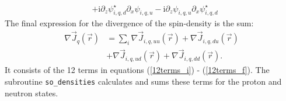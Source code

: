 \documentclass[4p]{elsarticle}
\begin{document}
\begin{itemize}
\begin{align}
& + \mathrm{i} \partial_z  \psi_{i,q,d}^\star \partial_x \psi_{i,q,u} - \mathrm{i} \partial_z \psi_{i,q,u} \partial_x  \psi_{i,q,d}^\star \nonumber
\label{12terms_f}
\end{align}
The final expression for the divergence of the spin-density is the sum:
\begin{align}
\nabla \vec{J}_q (\vec{r}) &=  \sum\nolimits_i  \nabla \vec{J}_{i,q, uu} (\vec{r}) + \nabla \vec{J}_{i,q, d u} (\vec{r}) \nonumber\\
&+ \nabla \vec{J}_{i,q, u d} (\vec{r}) + \nabla \vec{J}_{i,q, d d}  (\vec{r})  .
\end{align}
It consists of the 12 terms in equations (\ref{12terms_i}) - (\ref{12terms_f}). The subroutine \texttt{so\_densities} calculates and sums these terms for the proton and neutron states.
\end{itemize}
\end{document}
